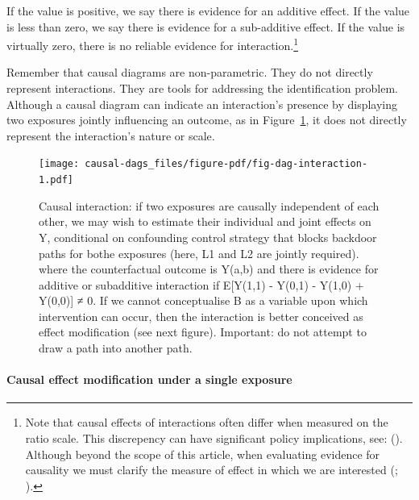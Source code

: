 \documentclass[
  singlecolumn,
  9pt]{article}
\let\oldparagraph\paragraph
\renewcommand{\paragraph}[1]{\oldparagraph{#1}\mbox{}}
\begin{document}
If the value is positive, we say there is evidence for an additive
effect. If the value is less than zero, we say there is evidence for a
sub-additive effect. If the value is virtually zero, there is no
reliable evidence for interaction.\footnote{Note that causal effects of
  interactions often differ when measured on the ratio scale. This
  discrepency can have significant policy implications, see:
  (). Although
  beyond the scope of this article, when evaluating evidence for
  causality we must clarify the measure of effect in which we are
  interested (;
  ).}

Remember that causal diagrams are non-parametric. They do not directly
represent interactions. They are tools for addressing the identification
problem. Although a causal diagram can indicate an interaction's
presence by displaying two exposures jointly influencing an outcome, as
in Figure~\ref{fig-dag-interaction}, it does not directly represent the
interaction's nature or scale.

\begin{figure}

{\centering \texttt{[image: causal-dags\_files/figure-pdf/fig-dag-interaction-1.pdf]}

}

\caption{\label{fig-dag-interaction}Causal interaction: if two exposures
are causally independent of each other, we may wish to estimate their
individual and joint effects on Y, conditional on confounding control
strategy that blocks backdoor paths for bothe exposures (here, L1 and L2
are jointly required). where the counterfactual outcome is Y(a,b) and
there is evidence for additive or subadditive interaction if E{[}Y(1,1)
- Y(0,1) - Y(1,0) + Y(0,0){]} ≠ 0. If we cannot conceptualise B as a
variable upon which intervention can occur, then the interaction is
better conceived as effect modification (see next figure). Important: do
not attempt to draw a path into another path.}

\end{figure}

\paragraph{\texorpdfstring{\textbf{Causal effect modification under a
single
exposure}}{Causal effect modification under a single exposure}}\label{causal-effect-modification-under-a-single-exposure}
\end{document}
